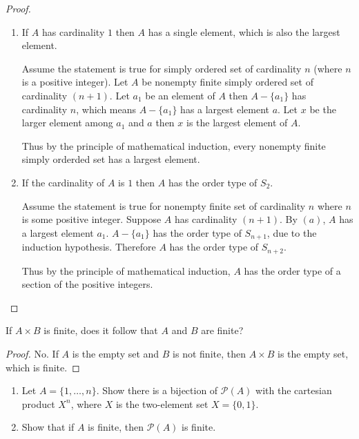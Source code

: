 \begin{proof}
    \begin{enumerate}[label={(\alph*)}]
        \item If $A$ has cardinality $1$ then $A$ has a single element, which is also the largest element.

              Assume the statement is true for simply ordered set of cardinality $n$ (where $n$ is a positive integer). Let $A$ be nonempty finite simply ordered set of cardinality $(n + 1)$. Let $a_{1}$ be an element of $A$ then $A - \{ a_{1} \}$ has cardinality $n$, which means $A - \{ a_{1} \}$ has a largest element $a$. Let $x$ be the larger element among $a_{1}$ and $a$ then $x$ is the largest element of $A$.

              Thus by the principle of mathematical induction, every nonempty finite simply orderded set has a largest element.
        \item If the cardinality of $A$ is $1$ then $A$ has the order type of $S_{2}$.

              Assume the statement is true for nonempty finite set of cardinality $n$ where $n$ is some positive integer. Suppose $A$ has cardinality $(n + 1)$. By $(a)$, $A$ has a largest element $a_{1}$. $A - \{ a_{1} \}$ has the order type of $S_{n+1}$, due to the induction hypothesis. Therefore $A$ has the order type of $S_{n+2}$.

              Thus by the principle of mathematical induction, $A$ has the order type of a section of the positive integers.
    \end{enumerate}
\end{proof}

\begin{exercise}\label{chapter1:section6:exercise5}
    If $A\times B$ is finite, does it follow that $A$ and $B$ are finite?
\end{exercise}

\begin{proof}
    No. If $A$ is the empty set and $B$ is not finite, then $A\times B$ is the empty set, which is finite.
\end{proof}

\begin{exercise}\label{chapter1:section6:exercise6}
    \begin{enumerate}[label={(\alph*)}]
        \item Let $A = \{ 1,\ldots,n \}$. Show there is a bijection of $\mathscr{P}(A)$ with the cartesian product $X^{n}$, where $X$ is the two-element set $X = \{ 0, 1 \}$.
        \item Show that if $A$ is finite, then $\mathscr{P}(A)$ is finite.
    \end{enumerate}
\end{exercise}

